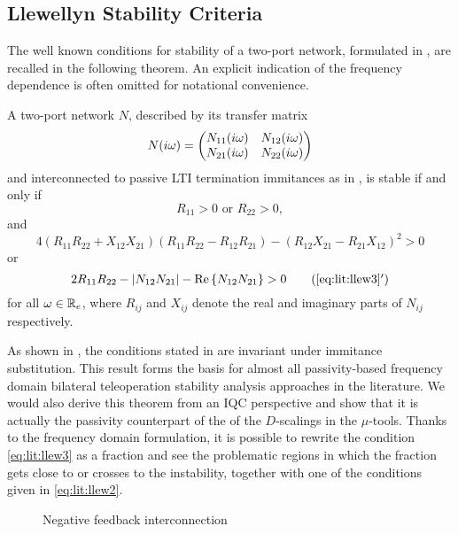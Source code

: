 \subsection{Llewellyn Stability Criteria}\label{sec:llewellyn}
The well known conditions for stability of a two-port network, formulated in \cite{llewellyn,bolinder,rollett}, are recalled in the 
following theorem. An explicit indication of the frequency dependence is  {often} omitted for notational convenience.
\begin{thm}\label{thm:apdx:llw}
A two-port network $N$,  described by its transfer matrix
\[
N(i\omega) = \begin{pmatrix}N_{11}(i\omega) &N_{12}(i\omega)\\N_{21}(i\omega) &N_{22}(i\omega)\end{pmatrix}
\]
and interconnected to passive LTI termination immitances as in , is stable if and only if
\begin{equation}R_{11} > 0\text{ or } R_{22} > 0,\label{eq:lit:llew2}\end{equation} and
\begin{equation}4\left(R_{11}R_{22}+X_{12}X_{21}\right)\left(R_{11}R_{22}-R_{12}R_{21}\right)-\left(R_{12}X_{21}-R_{21}X_{12}\right)^2 > 0\label{eq:lit:llew3}\end{equation} 
or
\begin{equation}2R_{11}R_{22}-\abs{N_{12}N_{21}}-\Re{N_{12}N_{21}} > 0\tag{\ref{eq:lit:llew3}$'$}\label{eq:lit:llew3p}\end{equation}
for all $\omega\in\mathbb{R}_e$, where $R_{ij}$ and $X_{ij}$ denote the real and imaginary parts of $N_{ij}$ respectively.
\end{thm}


As shown in \cite{rollett}, the conditions stated in  are invariant under immitance substitution. This result forms the 
basis for almost all passivity-based frequency domain bilateral teleoperation stability analysis approaches in the literature. 
We would also derive this theorem from an IQC perspective and show that it is actually the passivity counterpart of the 
of the $D$-scalings in the $\mu$-tools. Thanks to the frequency domain formulation, it is possible  to rewrite the condition 
\eqref{eq:lit:llew3} as a fraction and see the problematic regions in which the fraction gets close to or crosses to the instability, 
together with one of the conditions given in \eqref{eq:lit:llew2}. 


\begin{figure}%
\centering
{}
\caption{Negative feedback interconnection}%
\label{fig:lit:passint}%
\end{figure}

